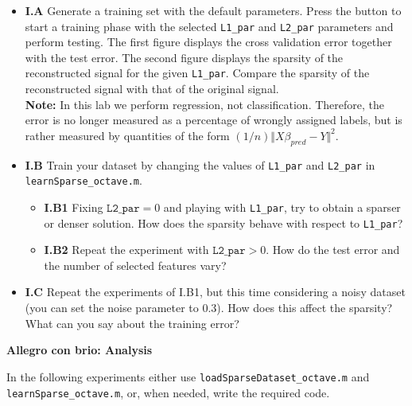 \documentclass[DIN, pagenumber=false, fontsize=11pt, parskip=half]{scrartcl}
\newcommand{\mysection}[1]{\noindent\large\textbf{#1}}
\begin{document}
\begin{itemize}
	\item \textbf{I.A} Generate a training set with the default parameters.
	Press the  button to start a training phase with the selected \texttt{L1\_par} and \texttt{L2\_par} parameters and perform testing.
	The first figure displays the cross validation error together with the test error.
	The second figure displays the sparsity of the reconstructed signal for the given \texttt{L1\_par}.
	Compare the sparsity of the reconstructed signal with that of the original signal.\\
	\textbf{Note:} In this lab we perform regression, not classification.
  Therefore, the error is no longer measured as a percentage of wrongly assigned labels, but is rather measured by quantities of the form $(1/n)\Vert X \beta_{pred} - Y \Vert^2$.

	\item \textbf{I.B} Train your dataset by changing the values of \texttt{L1\_par} and \texttt{L2\_par} in \texttt{learnSparse\_octave.m}.
	\begin{itemize}
		\item \textbf{I.B1} Fixing $\texttt{L2\_par}=0$ and playing with \texttt{L1\_par}, try to obtain a sparser or denser solution.
    How does the sparsity behave with respect to \texttt{L1\_par}?
		\item \textbf{I.B2} Repeat the experiment with $\texttt{L2\_par}>0$.
    How do the test error and the number of selected features vary?
\end{itemize}

	\item \textbf{I.C} Repeat the experiments of I.B1, but this time considering a noisy dataset (you can set the noise parameter to 0.3).
	How does this affect the sparsity?
	What can you say about the training error?

\end{itemize}



\mysection{Allegro con brio: Analysis}

In the following experiments either use \texttt{loadSparseDataset\_octave.m} and \texttt{learnSparse\_octave.m}, or, when needed, write the required code.
\end{document}
